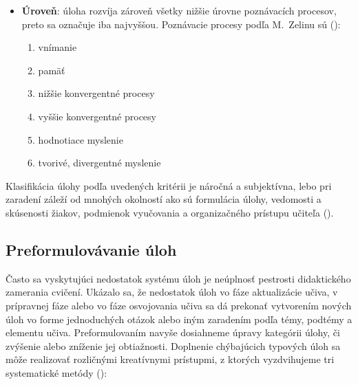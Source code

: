 \begin{itemize}[noitemsep]
\item \textbf{Úroveň}: úloha rozvíja zároveň všetky nižšie úrovne poznávacích procesov, preto sa označuje iba najvyššou. Poznávacie procesy podľa M.~Zelinu sú (\cite{zelina_tvorivost_1990}):
\begin{enumerate}[label=\alph*),noitemsep,topsep=0pt]
\item vnímanie
\item pamäť
\item nižšie konvergentné procesy
\item vyššie konvergentné procesy
\item hodnotiace myslenie
\item tvorivé, divergentné myslenie
\end{enumerate}
\end{itemize}

Klasifikácia úlohy podľa uvedených kritérii je náročná a subjektívna, lebo pri zaradení záleží od mnohých okolností ako sú formulácia úlohy, vedomosti a skúsenosti žiakov, podmienok vyučovania a organizačného prístupu učiteľa (\cite{mindakova_tvorba_2008}). 

\subsection{Preformulovávanie úloh}
Často sa vyskytujúci nedostatok systému úloh je neúplnosť pestrosti didaktického zamerania cvičení. Ukázalo sa, že nedostatok úloh vo fáze aktualizácie učiva, v prípravnej fáze alebo vo fáze osvojovania učiva sa dá prekonať vytvorením nových úloh vo forme jednoduchých otázok alebo iným zaradením podľa témy, podtémy a elementu učiva. Preformulovaním navyše dosiahneme úpravy kategórii úlohy, či zvýšenie alebo zníženie jej obtiažnosti. Doplnenie chýbajúcich typových úloh sa môže realizovať rozličnými kreatívnymi prístupmi, z ktorých vyzdvihujeme tri systematické metódy (\cite{mindakova_tvorba_2008}):

